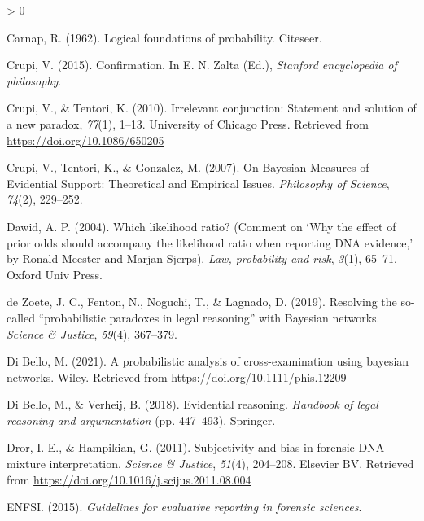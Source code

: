 \documentclass[
  10pt,
  dvipsnames,enabledeprecatedfontcommands]{scrartcl}
\newlength{\cslhangindent}
\newenvironment{CSLReferences}[2] %
 {%
  \setlength{\parindent}{0pt}
  \ifodd #1 \everypar{\setlength{\hangindent}{\cslhangindent}}\ignorespaces\fi
  \ifnum #2 > 0
  \setlength{\parskip}{#2\baselineskip}
  \fi
 }%
 {}
\begin{document}
\begin{CSLReferences}{1}{0}
\leavevmode\hypertarget{ref-carnap1962logical}{}%
Carnap, R. (1962). Logical foundations of probability. Citeseer.

\leavevmode\hypertarget{ref-crupi2015confirmation}{}%
Crupi, V. (2015). Confirmation. In E. N. Zalta (Ed.), \emph{Stanford
encyclopedia of philosophy}.

\leavevmode\hypertarget{ref-CrupiTentori2010irrelevant}{}%
Crupi, V., \& Tentori, K. (2010). Irrelevant conjunction: Statement and
solution of a new paradox, \emph{77}(1), 1--13. University of Chicago
Press. Retrieved from \url{https://doi.org/10.1086/650205}

\leavevmode\hypertarget{ref-crupi2007BayesianMeasuresEvidential}{}%
Crupi, V., Tentori, K., \& Gonzalez, M. (2007). On {Bayesian Measures}
of {Evidential Support}: {Theoretical} and {Empirical Issues}.
\emph{Philosophy of Science}, \emph{74}(2), 229--252.

\leavevmode\hypertarget{ref-dawid2004likelihood}{}%
Dawid, A. P. (2004). Which likelihood ratio? (Comment on {`{W}hy the
effect of prior odds should accompany the likelihood ratio when
reporting {DNA} evidence,'} by {R}onald {M}eester and {M}arjan
{S}jerps). \emph{Law, probability and risk}, \emph{3}(1), 65--71. Oxford
Univ Press.

\leavevmode\hypertarget{ref-dezoete2019ResolvingSocalledProbabilistic}{}%
de Zoete, J. C., Fenton, N., Noguchi, T., \& Lagnado, D. (2019).
Resolving the so-called {``probabilistic paradoxes in legal reasoning''}
with {Bayesian} networks. \emph{Science \& Justice}, \emph{59}(4),
367--379.

\leavevmode\hypertarget{ref-Bello2021probabilisticCrossexamination}{}%
Di Bello, M. (2021). A probabilistic analysis of cross-examination using
bayesian networks. Wiley. Retrieved from
\url{https://doi.org/10.1111/phis.12209}

\leavevmode\hypertarget{ref-di2018evidential}{}%
Di Bello, M., \& Verheij, B. (2018). Evidential reasoning.
\emph{Handbook of legal reasoning and argumentation} (pp. 447--493).
Springer.

\leavevmode\hypertarget{ref-Dror2011subjectivity}{}%
Dror, I. E., \& Hampikian, G. (2011). Subjectivity and bias in forensic
{DNA} mixture interpretation. \emph{Science {\&} Justice}, \emph{51}(4),
204--208. Elsevier {BV}. Retrieved from
\url{https://doi.org/10.1016/j.scijus.2011.08.004}

\leavevmode\hypertarget{ref-enfs2015}{}%
ENFSI. (2015). \emph{Guidelines for evaluative reporting in forensic
sciences}.


\end{CSLReferences}
\end{document}
